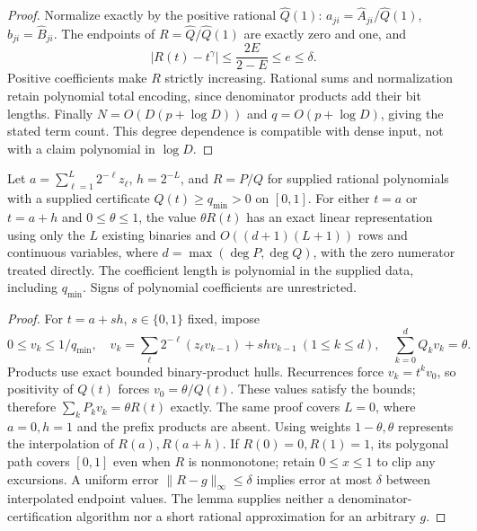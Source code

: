 \begin{proof}
Normalize exactly by the positive rational $\widehat Q(1)$:
$a_{ji}=\widehat A_{ji}/\widehat Q(1)$, $b_{ji}=\widehat B_{ji}$.
The endpoints of $R=\widehat Q/\widehat Q(1)$ are exactly zero
and one, and
\[
 |R(t)-t^\gamma|\le\frac{2E}{2-E}\le e\le\delta.
\]
Positive coefficients make $R$ strictly increasing. Rational sums
and normalization retain polynomial total encoding, since denominator
products add their bit lengths. Finally $N=O(D(p+\log D))$ and
$q=O(p+\log D)$, giving the stated term count. This degree dependence
is compatible with dense input, not with a claim polynomial in $\log D$.
\end{proof}

\begin{lemma}
\label{lem:rational-endpoint-products}
Let $a=\sum_{\ell=1}^L2^{-\ell}z_\ell$, $h=2^{-L}$, and
$R=P/Q$ for supplied rational polynomials with a supplied certificate
$Q(t)\ge q_{\min}>0$ on $[0,1]$. For either $t=a$ or $t=a+h$
and $0\le\theta\le1$, the value $\theta R(t)$ has an exact linear
representation using only the $L$ existing binaries and
$O((d+1)(L+1))$ rows and continuous variables, where
$d=\max(\deg P,\deg Q)$, with the zero numerator treated directly.
The coefficient length is polynomial in the supplied data, including
$q_{\min}$. Signs of polynomial coefficients are unrestricted.
\end{lemma}
\begin{proof}
For $t=a+sh$, $s\in\{0,1\}$ fixed, impose
\[
 0\le v_k\le1/q_{\min},\quad
 v_k=\sum_\ell2^{-\ell}(z_\ell v_{k-1})+shv_{k-1}
 \ (1\le k\le d),\quad
 \sum_{k=0}^dQ_kv_k=\theta.
\]
Products use exact bounded binary-product hulls. Recurrences force
$v_k=t^kv_0$, so positivity of $Q(t)$ forces
$v_0=\theta/Q(t)$. These values satisfy the bounds; therefore
$\sum_kP_kv_k=\theta R(t)$ exactly. The same proof covers $L=0$,
where $a=0,h=1$ and the prefix products are absent. Using weights
$1-\theta,\theta$ represents the interpolation of $R(a),R(a+h)$.
If $R(0)=0,R(1)=1$, its polygonal path covers $[0,1]$ even when
$R$ is nonmonotone; retain $0\le x\le1$ to clip any excursions.
A uniform error $\|R-g\|_\infty\le\delta$ implies error at most
$\delta$ between interpolated endpoint values. The lemma supplies
neither a denominator-certification algorithm nor a short rational
approximation for an arbitrary $g$.
\end{proof}

